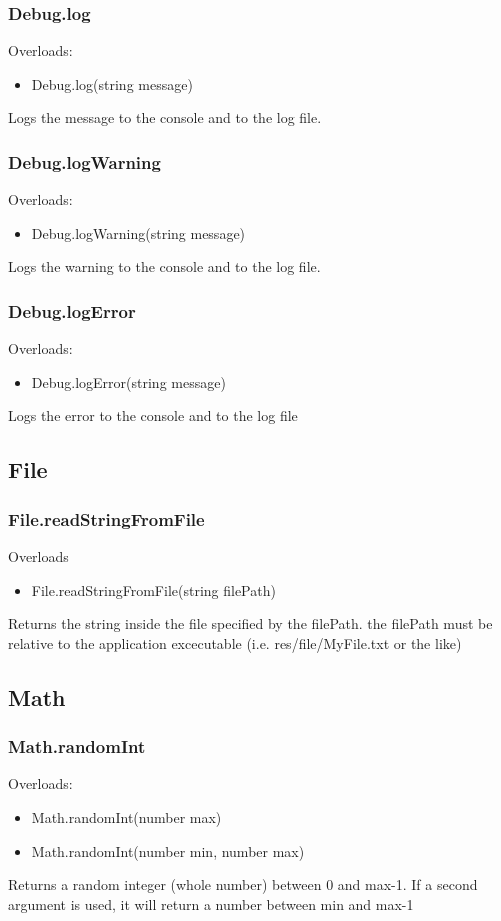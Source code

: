 \documentclass{book}
\newenvironment{ulist}
	{\begin{itemize}
			\itemsep0em}
	{\end{itemize}}
\begin{document}
\subsubsection{Debug.log}
Overloads:
\begin{ulist}
	\item Debug.log(string message)
\end{ulist}
Logs the message to the console and to the log file.

\subsubsection{Debug.logWarning}
Overloads:
\begin{ulist}
	\item Debug.logWarning(string message)
\end{ulist}
Logs the warning to the console and to the log file.

\subsubsection{Debug.logError}
Overloads:
\begin{ulist}
	\item Debug.logError(string message)
\end{ulist}
Logs the error to the console and to the log file


\subsection{File}
\subsubsection{File.readStringFromFile}
Overloads
\begin{ulist}
	\item File.readStringFromFile(string filePath)
\end{ulist}
Returns the string inside the file specified by the filePath. the filePath must be relative to the application excecutable (i.e. res/file/MyFile.txt or the like)


\subsection{Math}
\subsubsection{Math.randomInt}
Overloads:
\begin{ulist}
	\item Math.randomInt(number max)
	\item Math.randomInt(number min, number max)
\end{ulist}
Returns a random integer (whole number) between 0 and max-1.
If a second argument is used, it will return a number between min and max-1
\end{document}
